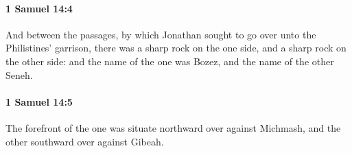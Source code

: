 		\paragraph{1 Samuel 14:4} %
			\label{1SAMUEL-14-4}

			And between the passages, by which Jonathan sought to go over unto the Philistines’ garrison, there was a sharp rock on the one side, and a sharp rock on the other side: and the name of the one was Bozez, and the name of the other Seneh.


		\paragraph{1 Samuel 14:5} %
			\label{1SAMUEL-14-5}

			The forefront of the one was situate northward over against Michmash, and the other southward over against Gibeah.


